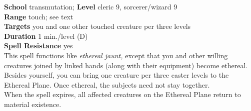 \textbf{School} transmutation; \textbf{Level} cleric 9, sorcerer/wizard 9\\
\textbf{Range} touch; see text\\
\textbf{Targets} you and one other touched creature per three levels\\
\textbf{Duration} 1 min./level (D)\\
\textbf{Spell Resistance} yes\\
This spell functions like \textit{ethereal jaunt, }except that you and other willing creatures joined by linked hands (along with their equipment) become ethereal. Besides yourself, you can bring one creature per three caster levels to the Ethereal Plane. Once ethereal, the subjects need not stay together.\\
When the spell expires, all affected creatures on the Ethereal Plane return to material existence.\\
